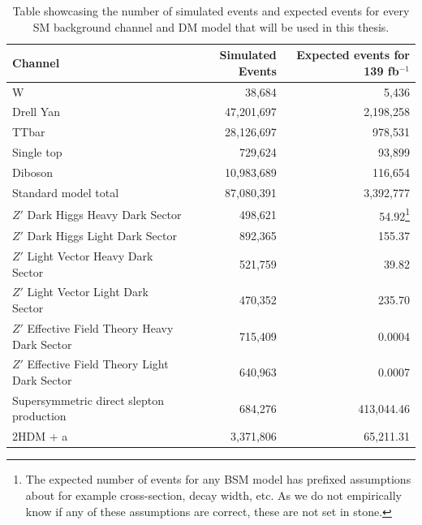 \documentclass[12pt, a4paper]{book}
\begin{document}
\begin{table}[!h]
   \centering
    \caption[Dataset used for ML]{Table showcasing the number of simulated events and expected events for every SM background channel and DM model that will be used in this thesis.}
    \footnotesize\begin{tabular}{l|r|r}\midrule\midrule
      Channel                                                                         & Simulated Events            & Expected events for 139 fb$^{-1}$ \\\midrule
      W                                                                               & 38,684                & 5,436        \\
      Drell Yan                                                                       & 47,201,697            & 2,198,258    \\
      TTbar                                                                           & 28,126,697            & 978,531      \\
      Single top                                                                      & 729,624               & 93,899       \\
      Diboson                                                                         & 10,983,689            & 116,654      \\\midrule
      Standard model total                                                            & 87,080,391            & 3,392,777    \\\midrule
      $Z'$ Dark Higgs Heavy Dark Sector                                               & 498,621               & 54.92\footnote{The expected number of events for any BSM model has prefixed assumptions about for example cross-section, decay width, etc. As we do not empirically know if any of these assumptions are correct, these are not set in stone.}         \\
      $Z'$ Dark Higgs Light Dark Sector                                               & 892,365               & 155.37         \\
      $Z'$ Light Vector Heavy Dark Sector                                             & 521,759               & 39.82         \\
      $Z'$ Light Vector Light Dark Sector                                             & 470,352               & 235.70         \\
      $Z'$ Effective Field Theory Heavy Dark Sector                                   & 715,409               & 0.0004           \\
      $Z'$ Effective Field Theory Light Dark Sector                                   & 640,963               & 0.0007          \\
      Supersymmetric direct slepton production                                        & 684,276               & 413,044.46        \\
      2HDM + a                                                                        & 3,371,806             & 65,211.31         \\\midrule\midrule
   \end{tabular}
   \label{tab:dataset}
\end{table}
\end{document}

